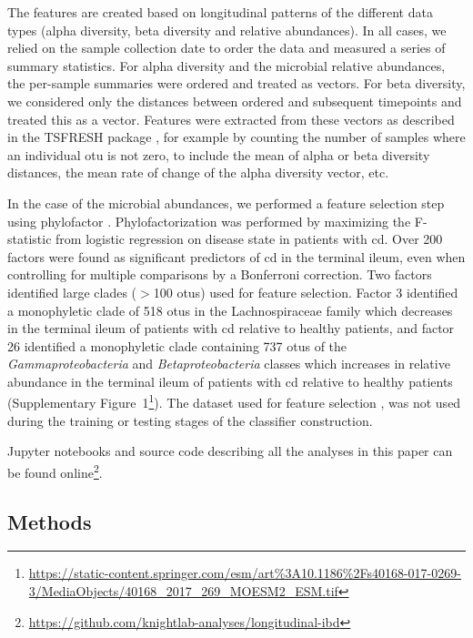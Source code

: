 The features are created based on longitudinal patterns of the different data types (alpha diversity, beta diversity and relative abundances). In all cases, we relied on the sample collection date to order the data and measured a series of summary statistics. For alpha diversity and the microbial relative abundances, the per-sample summaries were ordered and treated as vectors. For beta diversity, we considered only the distances between ordered and subsequent timepoints and treated this as a vector. Features were extracted from these vectors as described in the TSFRESH package \cite{RN4216}, for example by counting the number of samples where an individual \gls{otu} is not zero, to include the mean of alpha or beta diversity distances, the mean rate of change of the alpha diversity vector, etc.

In the case of the microbial abundances, we performed a feature selection step using phylofactor \cite{RN4204}. Phylofactorization was performed by maximizing the F-statistic from logistic regression on disease state in patients with \gls{cd}. Over 200 factors were found as significant predictors of \gls{cd} in the terminal ileum, even when controlling for multiple comparisons by a Bonferroni correction. Two factors identified large clades ($>$100 \glspl{otu}) used for feature selection. Factor 3 identified a monophyletic clade of 518 \glspl{otu} in the Lachnospiraceae family which decreases in the terminal ileum of patients with \gls{cd} relative to healthy patients, and factor 26 identified a monophyletic clade containing 737 \glspl{otu} of the \textit{Gammaproteobacteria} and \textit{Betaproteobacteria} classes which increases in relative abundance in the terminal ileum of patients with \gls{cd} relative to healthy patients (Supplementary Figure~1\footnote{\url{https://static-content.springer.com/esm/art\%3A10.1186\%2Fs40168-017-0269-3/MediaObjects/40168_2017_269_MOESM2_ESM.tif}}). The dataset used for feature selection \cite{RN154}, was not used during the training or testing stages of the classifier construction.

Jupyter notebooks and source code describing all the analyses in this paper can be found online\footnote{\url{https://github.com/knightlab-analyses/longitudinal-ibd}}.

\subsection{Methods}

